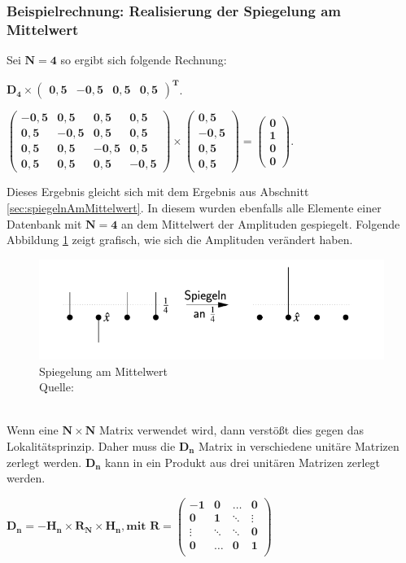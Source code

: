\subsubsection{Beispielrechnung: Realisierung der Spiegelung am Mittelwert}
\label{seg:bspSpiegelungAmMittelwert}
Sei $\mathbf{N = 4}$ so ergibt sich folgende Rechnung:
\begin{center}
	$\mathbf{D_4  \times \begin{pmatrix}
			0,5 & -0,5 & 0,5 & 0,5
		\end{pmatrix}^T}$.
	
	$\mathbf{\begin{pmatrix}
			-0,5 & 0,5 &0,5&0,5\\
			0,5 & -0,5 &0,5&0,5\\
			0,5 & 0,5 &-0,5&0,5\\
			0,5 & 0,5 &0,5&-0,5
		\end{pmatrix}
		\times \begin{pmatrix} 0,5 \\ -0,5 \\ 0,5 \\ 0,5 \end{pmatrix} = \begin{pmatrix} 0\\1\\0\\0 \end{pmatrix}
	}$.
\end{center}
Dieses Ergebnis gleicht sich mit dem Ergebnis aus Abschnitt \ref{sec:spiegelnAmMittelwert}. In diesem wurden ebenfalls alle Elemente einer Datenbank mit $\mathbf{N=4}$ an dem Mittelwert der Amplituden gespiegelt. Folgende Abbildung \ref{fig:spiegelung} zeigt grafisch, wie sich die Amplituden verändert haben.
\begin{figure}[hbtp]
	\centering
	\includegraphics[width=.8\textwidth]{figures/spiegelung.png}
	\caption{Spiegelung am Mittelwert \\ Quelle: \cite[S. 142]{Homeister.2018}}
	\label{fig:spiegelung}
\end{figure}
\noindent
\\
Wenn eine $\mathbf{N \times N}$ Matrix verwendet wird, dann verstößt dies gegen das Lokalitätsprinzip. Daher muss die $\mathbf{D_n}$ Matrix in verschiedene unitäre Matrizen zerlegt werden.  $\mathbf{D_n}$ kann in ein Produkt aus drei unitären Matrizen zerlegt werden.
\begin{center}
	$\mathbf{D_n = -H_n \times R_N \times H_n, \text{mit } R  = 
		\begin{pmatrix}
			-1 & 0 &\dots& 0 \\
			0& 1& \ddots& \vdots\\
			\vdots &\ddots& \ddots&0 \\
			0& \dots& 0 &1 \\
	\end{pmatrix}}$
\end{center}
